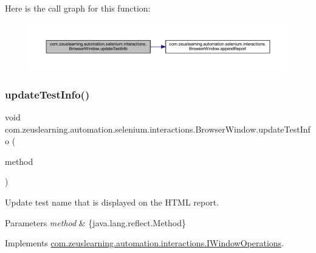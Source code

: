 Here is the call graph for this function\+:
\nopagebreak
\begin{figure}[H]
\begin{center}
\leavevmode
\includegraphics[width=350pt]{d8/d87/classcom_1_1zeuslearning_1_1automation_1_1selenium_1_1interactions_1_1BrowserWindow_ac5cee2e884ceca2b0d7367e40aff6942_cgraph}
\end{center}
\end{figure}
\hypertarget{classcom_1_1zeuslearning_1_1automation_1_1selenium_1_1interactions_1_1BrowserWindow_a7cc2714d601bc96f3d9262b662b27a2e}{}\label{classcom_1_1zeuslearning_1_1automation_1_1selenium_1_1interactions_1_1BrowserWindow_a7cc2714d601bc96f3d9262b662b27a2e} 
\subsubsection{\texorpdfstring{update\+Test\+Info()}{updateTestInfo()}\hspace{0.1cm}{\footnotesize\ttfamily [2/2]}}
{\footnotesize\ttfamily void com.\+zeuslearning.\+automation.\+selenium.\+interactions.\+Browser\+Window.\+update\+Test\+Info (\begin{DoxyParamCaption}\item[{Method}]{method }\end{DoxyParamCaption})\hspace{0.3cm}{\ttfamily [inline]}}

Update test name that is displayed on the H\+T\+ML report.


\begin{DoxyParams}{Parameters}
{\em method} & \{java.\+lang.\+reflect.\+Method\} \\
\hline
\end{DoxyParams}


Implements \hyperlink{interfacecom_1_1zeuslearning_1_1automation_1_1interactions_1_1IWindowOperations_a8415fde5770dfadfed5b07f514251e2c}{com.\+zeuslearning.\+automation.\+interactions.\+I\+Window\+Operations}.

